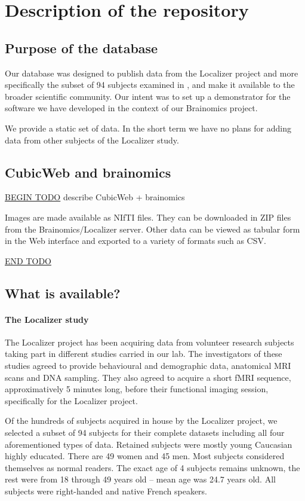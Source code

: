 \documentclass[review]{elsarticle}
\begin{document}
\section{Description of the repository}

\subsection{Purpose of the database}

Our database was designed to publish data from the Localizer project
\cite{Pinel2007} and more specifically the subset of 94 subjects examined
in \cite{Pinel2012}, and make it available to the broader
scientific community. Our intent was to set up a demonstrator for the
software we have developed in the context of our Brainomics project.

We provide a static set of data. In the short term we have no plans for
adding data from other subjects of the Localizer study.

\subsection{CubicWeb and brainomics}

\underline{BEGIN TODO} describe CubicWeb + brainomics

Images are made available as NIfTI files. They can be downloaded in ZIP files from
the Brainomics/Localizer server. Other data can be viewed as tabular form in the Web
interface and exported to a variety of formats such as CSV.

\underline{END TODO}

\subsection{What is available?}

\paragraph{The Localizer study} The Localizer project has been acquiring data
from volunteer research subjects taking part in different studies carried
in our lab. The investigators of these studies agreed to provide behavioural
and demographic data, anatomical MRI scans and DNA sampling. They also agreed to
acquire a short fMRI sequence, approximatively 5 minutes long, before their functional
imaging session, specifically for the Localizer project.

Of the hundreds of subjects acquired in house by the Localizer project, we
selected a subset of 94 subjects for their complete datasets \cite{Pinel2012}
including all four aforementioned types of data. Retained subjects were mostly
young Caucasian highly educated. There are 49 women and 45 men. Most subjects
considered themselves as normal readers. The exact age of 4 subjects remains
unknown, the rest were from 18 through 49 years old -- mean age was 24.7
years old. All subjects were right-handed and native French speakers.
\end{document}
